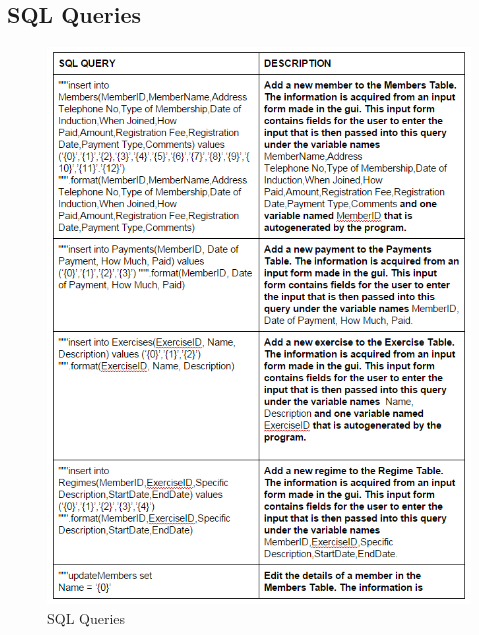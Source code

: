 \begin{itemize}
\subsection{SQL Queries}

\begin{figure}[H]
    \includegraphics[width=\textwidth]{Queries1.PNG}
    \caption{SQL Queries} \label{fig:SQL Queries}
\end{figure}


\end{itemize}

